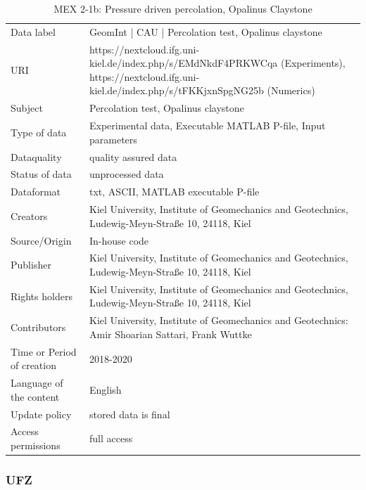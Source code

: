 \begin{table}[!ht]
\caption{MEX 2-1b: Pressure driven percolation, Opalinus Claystone}
\label{tab:dms-mex2-1b}
\small
\begin{tabular}{R{3cm}|L{7cm}}
\hline
%
Data label & GeomInt | CAU | Percolation test, Opalinus claystone\\
URI &  https://nextcloud.ifg.uni-kiel.de/index.php/s/EMdNkdF4PRKWCqa (Experiments), https://nextcloud.ifg.uni-kiel.de/index.php/s/tFKKjxnSpgNG25b (Numerics)
\\
Subject  &  Percolation test, Opalinus claystone\\
Type of data  & Experimental data, Executable MATLAB P-file, Input parameters\\
Dataquality  &  quality assured data \\
Status of data  &  unprocessed data\\
Dataformat  & txt, ASCII, MATLAB executable P-file\\
Creators  &  Kiel University, Institute of Geomechanics and Geotechnics, Ludewig-Meyn-Stra\ss e 10, 24118, Kiel\\
Source/Origin & In-house code \\
Publisher  &  Kiel University, Institute of Geomechanics and Geotechnics, Ludewig-Meyn-Stra\ss e 10, 24118, Kiel \\
Rights holders &  Kiel University, Institute of Geomechanics and Geotechnics, Ludewig-Meyn-Stra\ss e 10, 24118, Kiel \\
Contributors &   Kiel University, Institute of Geomechanics and Geotechnics: Amir Shoarian Sattari, Frank Wuttke\\
Time or Period of creation &  2018-2020\\
Language of the content &  English\\
Update policy &  stored data is final\\
Access permissions & full access\\
%
\hline
\end{tabular}
\end{table}

\subsubsection*{UFZ}

